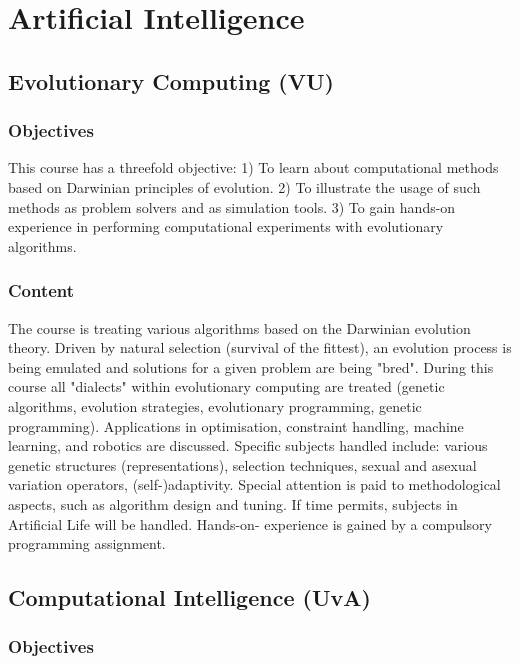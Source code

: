 \documentclass[11pt]{article}
\begin{document}
\section{Artificial Intelligence}
\label{sec:org3afa82d}

\subsection{Evolutionary Computing (VU)}
\label{sec:org0043907}

\subsubsection{Objectives}
\label{sec:org5201ba4}

This course has a threefold objective: 1) To learn about computational methods
based on Darwinian principles of evolution. 2) To illustrate the usage of such
methods as problem solvers and as simulation tools. 3) To gain hands-on
experience in performing computational experiments with evolutionary algorithms.

\subsubsection{Content}
\label{sec:org5fb6e57}

The course is treating various algorithms based on the Darwinian evolution
theory. Driven by natural selection (survival of the fittest), an evolution
process is being emulated and solutions for a given problem are being "bred".
During this course all "dialects" within evolutionary computing are treated
(genetic algorithms, evolution strategies, evolutionary programming, genetic
programming). Applications in optimisation, constraint handling, machine
learning, and robotics are discussed. Specific subjects handled include: various
genetic structures (representations), selection techniques, sexual and asexual
variation operators, (self-)adaptivity. Special attention is paid to
methodological aspects, such as algorithm design and tuning. If time permits,
subjects in Artificial Life will be handled. Hands-on- experience is gained by a
compulsory programming assignment.

\subsection{Computational Intelligence (UvA)}
\label{sec:org259849f}

\subsubsection{Objectives}
\label{sec:orgf251e2c}
\end{document}
